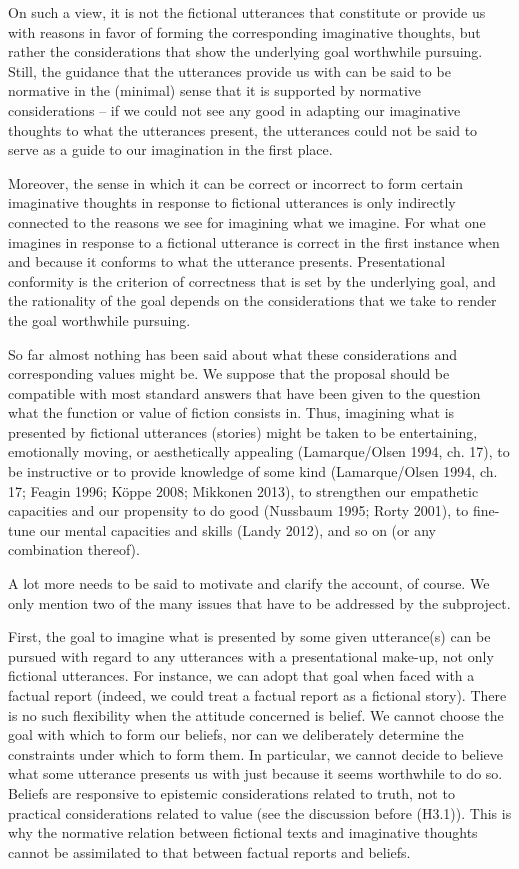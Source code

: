 \noindent On such a view, it is not the fictional utterances that constitute or provide us with reasons in favor of forming the corresponding imaginative thoughts, but rather the considerations that show the underlying goal worthwhile pursuing. Still, the guidance that the utterances provide us with can be said to be normative in the (minimal) sense that it is supported by normative considerations -- if we could not see any good in adapting our imaginative thoughts to what the utterances present, the utterances could not be said to serve as a guide to our imagination in the first place.

Moreover, the sense in which it can be correct or incorrect to form certain imaginative thoughts in response to fictional utterances is only indirectly connected to the reasons we see for imagining what we imagine. For what one imagines in response to a fictional utterance is correct in the first instance when and because it conforms to what the utterance presents. Presentational conformity is the criterion of correctness that is set by the underlying goal, and the rationality of the goal depends on the considerations that we take to render the goal worthwhile pursuing.

So far almost nothing has been said about what these considerations and corresponding values might be. We suppose that the proposal should be compatible with most standard answers that have been given to the question what the function or value of fiction consists in. Thus, imagining what is presented by fictional utterances (stories) might be taken to be entertaining, emotionally moving, or aesthetically appealing (Lamarque/Olsen 1994, ch. 17), to be instructive or to provide knowledge of some kind (Lamarque/Olsen 1994, ch. 17; Feagin 1996; K\"oppe 2008; Mikkonen 2013), to strengthen our empathetic capacities and our propensity to do good (Nussbaum 1995; Rorty 2001), to fine-tune our mental capacities and skills (Landy 2012), and so on (or any combination thereof).

A lot more needs to be said to motivate and clarify the account, of course. We only mention two of the many issues that have to be addressed by the subproject.

First, the goal to imagine what is presented by some given utterance(s) can be pursued with regard to any utterances with a presentational make-up, not only fictional utterances. For instance, we can adopt that goal when faced with a factual report (indeed, we could treat a factual report as a fictional story). There is no such flexibility when the attitude concerned is belief. We cannot choose the goal with which to form our beliefs, nor can we deliberately determine the constraints under which to form them. In particular, we cannot decide to believe what some utterance presents us with just because it seems worthwhile to do so. Beliefs are responsive to epistemic considerations related to truth, not to practical considerations related to value (see the discussion before (H3.1)). This is why the normative relation between fictional texts and imaginative thoughts cannot be assimilated to that between factual reports and beliefs.

